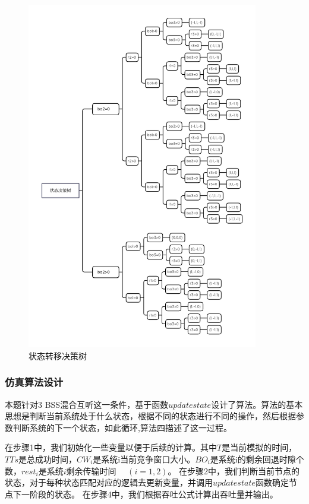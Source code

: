 \documentclass[bwprint]{gmcmthesis}
\begin{document}
\begin{figure}[H]
\centering
\includegraphics[width=0.9\textwidth]{figures/tree.png}
\caption{状态转移决策树}
\label{fig:tree}
\end{figure}



\subsubsection{仿真算法设计}

本题针对3 BSS混合互听这一条件，基于函数$updatestate$设计了算法。算法的基本思想是判断当前系统处于什么状态，根据不同的状态进行不同的操作，然后根据参数判断系统的下一个状态，如此循环,算法四描述了这一过程。

在步骤1中，我们初始化一些变量以便于后续的计算。其中$T$是当前模拟的时间，$TTs$是总成功时间，$CW_i$是系统i当前竞争窗口大小。$BO_i$是系统i的剩余回退时隙个数，$rest_i$是系统$i$剩余传输时间 \ \ $(i=1,2)$。
在步骤2中，我们判断当前节点的状态，对于每种状态匹配对应的逻辑去更新变量，并调用$updatestate$函数确定节点下一阶段的状态。
在步骤4中，我们根据吞吐公式计算出吞吐量并输出。
\end{document}
